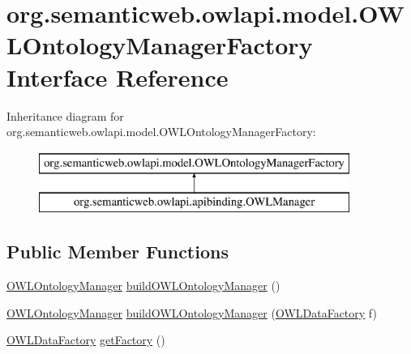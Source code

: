 \hypertarget{interfaceorg_1_1semanticweb_1_1owlapi_1_1model_1_1_o_w_l_ontology_manager_factory}{\section{org.\-semanticweb.\-owlapi.\-model.\-O\-W\-L\-Ontology\-Manager\-Factory Interface Reference}
\label{interfaceorg_1_1semanticweb_1_1owlapi_1_1model_1_1_o_w_l_ontology_manager_factory}
}
Inheritance diagram for org.\-semanticweb.\-owlapi.\-model.\-O\-W\-L\-Ontology\-Manager\-Factory\-:\begin{figure}[H]
\begin{center}
\leavevmode
\includegraphics[height=2.000000cm]{interfaceorg_1_1semanticweb_1_1owlapi_1_1model_1_1_o_w_l_ontology_manager_factory}
\end{center}
\end{figure}
\subsection*{Public Member Functions}
\begin{DoxyCompactItemize}
\item 
\hyperlink{interfaceorg_1_1semanticweb_1_1owlapi_1_1model_1_1_o_w_l_ontology_manager}{O\-W\-L\-Ontology\-Manager} \hyperlink{interfaceorg_1_1semanticweb_1_1owlapi_1_1model_1_1_o_w_l_ontology_manager_factory_a2c503d4624e5d08b7c363d001661b28d}{build\-O\-W\-L\-Ontology\-Manager} ()
\item 
\hyperlink{interfaceorg_1_1semanticweb_1_1owlapi_1_1model_1_1_o_w_l_ontology_manager}{O\-W\-L\-Ontology\-Manager} \hyperlink{interfaceorg_1_1semanticweb_1_1owlapi_1_1model_1_1_o_w_l_ontology_manager_factory_af91641046c5866e4a47917dbfe7ffba9}{build\-O\-W\-L\-Ontology\-Manager} (\hyperlink{interfaceorg_1_1semanticweb_1_1owlapi_1_1model_1_1_o_w_l_data_factory}{O\-W\-L\-Data\-Factory} f)
\item 
\hyperlink{interfaceorg_1_1semanticweb_1_1owlapi_1_1model_1_1_o_w_l_data_factory}{O\-W\-L\-Data\-Factory} \hyperlink{interfaceorg_1_1semanticweb_1_1owlapi_1_1model_1_1_o_w_l_ontology_manager_factory_ae5da14deadd890e2869d457d2c8e602e}{get\-Factory} ()
\end{DoxyCompactItemize}


